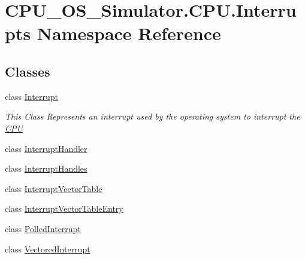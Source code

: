 \hypertarget{namespace_c_p_u___o_s___simulator_1_1_c_p_u_1_1_interrupts}{}\section{C\+P\+U\+\_\+\+O\+S\+\_\+\+Simulator.\+C\+P\+U.\+Interrupts Namespace Reference}
\label{namespace_c_p_u___o_s___simulator_1_1_c_p_u_1_1_interrupts}
\subsection*{Classes}
\begin{DoxyCompactItemize}
\item 
class \hyperlink{class_c_p_u___o_s___simulator_1_1_c_p_u_1_1_interrupts_1_1_interrupt}{Interrupt}
\begin{DoxyCompactList}\small\item\em This Class Represents an interrupt used by the operating system to interrupt the \hyperlink{namespace_c_p_u___o_s___simulator_1_1_c_p_u}{C\+P\+U} \end{DoxyCompactList}\item 
class \hyperlink{class_c_p_u___o_s___simulator_1_1_c_p_u_1_1_interrupts_1_1_interrupt_handler}{Interrupt\+Handler}
\item 
class \hyperlink{class_c_p_u___o_s___simulator_1_1_c_p_u_1_1_interrupts_1_1_interrupt_handles}{Interrupt\+Handles}
\item 
class \hyperlink{class_c_p_u___o_s___simulator_1_1_c_p_u_1_1_interrupts_1_1_interrupt_vector_table}{Interrupt\+Vector\+Table}
\item 
class \hyperlink{class_c_p_u___o_s___simulator_1_1_c_p_u_1_1_interrupts_1_1_interrupt_vector_table_entry}{Interrupt\+Vector\+Table\+Entry}
\item 
class \hyperlink{class_c_p_u___o_s___simulator_1_1_c_p_u_1_1_interrupts_1_1_polled_interrupt}{Polled\+Interrupt}
\item 
class \hyperlink{class_c_p_u___o_s___simulator_1_1_c_p_u_1_1_interrupts_1_1_vectored_interrupt}{Vectored\+Interrupt}
\end{DoxyCompactItemize}
